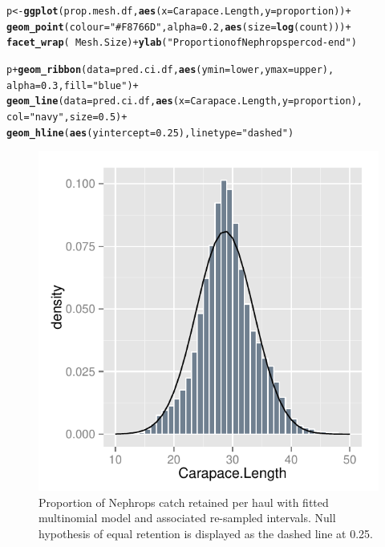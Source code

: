 \documentclass[12pt]{article}\usepackage[]{graphicx}\usepackage[]{color}
\makeatletter
\def\maxwidth{ %
  \ifdim\Gin@nat@width>\linewidth
    \linewidth
  \else
    \Gin@nat@width
  \fi
}
\newcommand{\hlnum}[1]{\textcolor[rgb]{0.686,0.059,0.569}{#1}}%
\newcommand{\hlstr}[1]{\textcolor[rgb]{0.192,0.494,0.8}{#1}}%
\newcommand{\hlopt}[1]{\textcolor[rgb]{0,0,0}{#1}}%
\newcommand{\hlstd}[1]{\textcolor[rgb]{0.345,0.345,0.345}{#1}}%
\newcommand{\hlkwb}[1]{\textcolor[rgb]{0.69,0.353,0.396}{#1}}%
\newcommand{\hlkwc}[1]{\textcolor[rgb]{0.333,0.667,0.333}{#1}}%
\newcommand{\hlkwd}[1]{\textcolor[rgb]{0.737,0.353,0.396}{\textbf{#1}}}%
\newenvironment{kframe}{%
 \def\at@end@of@kframe{}%
 \ifinner\ifhmode%
  \def\at@end@of@kframe{\end{minipage}}%
  \begin{minipage}{\columnwidth}%
 \fi\fi%
 \def\FrameCommand##1{\hskip\@totalleftmargin \hskip-\fboxsep
 \colorbox{shadecolor}{##1}\hskip-\fboxsep
     \hskip-\linewidth \hskip-\@totalleftmargin \hskip\columnwidth}%
 \MakeFramed {\advance\hsize-\width
   \@totalleftmargin\z@ \linewidth\hsize
   \@setminipage}}%
 {\par\unskip\endMakeFramed%
 \at@end@of@kframe}
\newenvironment{knitrout}{}{} %
\makeatother
\begin{document}
\begin{knitrout}\footnotesize
{}\color{fgcolor}\begin{kframe}
\begin{alltt}
\hlstd{p} \hlkwb{<-} \hlkwd{ggplot}\hlstd{(prop.mesh.df,} \hlkwd{aes}\hlstd{(}\hlkwc{x} \hlstd{= Carapace.Length,} \hlkwc{y} \hlstd{= proportion))} \hlopt{+}
  \hlkwd{geom_point}\hlstd{(}\hlkwc{colour} \hlstd{=} \hlstr{"#F8766D"}\hlstd{,} \hlkwc{alpha} \hlstd{=} \hlnum{0.2}\hlstd{,} \hlkwd{aes}\hlstd{(}\hlkwc{size} \hlstd{=} \hlkwd{log}\hlstd{(count)))} \hlopt{+}
\hlkwd{facet_wrap}\hlstd{(}\hlopt{~} \hlstd{Mesh.Size)} \hlopt{+} \hlkwd{ylab}\hlstd{(}\hlstr{"Proportion of Nephrops per cod-end"}\hlstd{)}

\hlstd{p} \hlopt{+} \hlkwd{geom_ribbon}\hlstd{(}\hlkwc{data}\hlstd{=pred.ci.df,} \hlkwd{aes}\hlstd{(}\hlkwc{ymin} \hlstd{= lower,} \hlkwc{ymax} \hlstd{= upper),}
                \hlkwc{alpha}\hlstd{=}\hlnum{0.3}\hlstd{,} \hlkwc{fill} \hlstd{=} \hlstr{"blue"}\hlstd{)} \hlopt{+}
  \hlkwd{geom_line}\hlstd{(}\hlkwc{data} \hlstd{= pred.ci.df,} \hlkwd{aes}\hlstd{(}\hlkwc{x} \hlstd{= Carapace.Length,} \hlkwc{y} \hlstd{= proportion),}
            \hlkwc{col} \hlstd{=} \hlstr{"navy"}\hlstd{,} \hlkwc{size} \hlstd{=} \hlnum{0.5}\hlstd{)} \hlopt{+}
  \hlkwd{geom_hline}\hlstd{(}\hlkwd{aes}\hlstd{(}\hlkwc{yintercept} \hlstd{=} \hlnum{0.25}\hlstd{),} \hlkwc{linetype} \hlstd{=} \hlstr{"dashed"}\hlstd{)}
\end{alltt}
\end{kframe}\begin{figure}
\includegraphics[width=\maxwidth]{figure/unnamed-chunk-7-1} \caption[Proportion of Nephrops catch retained per haul with fitted multinomial model and associated re-sampled intervals]{Proportion of Nephrops catch retained per haul with fitted multinomial model and associated re-sampled intervals. Null hypothesis of equal retention is displayed as the dashed line at 0.25.}\label{fig:unnamed-chunk-7}
\end{figure}



\end{knitrout}
\end{document}

